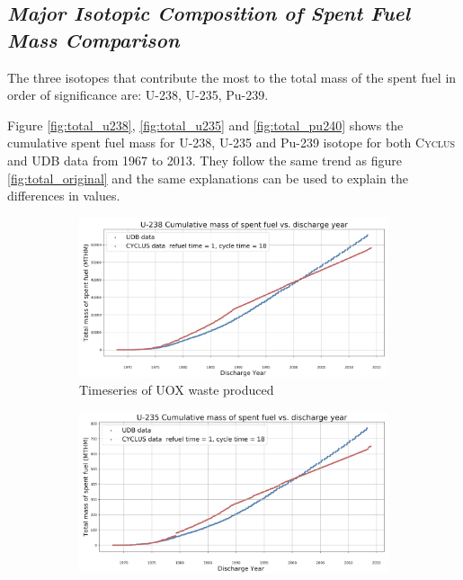 \documentclass{anstrans}
\newcommand{\Cyclus}{\textsc{Cyclus}\xspace}%
\begin{document}
\subsection{\textit{Major Isotopic Composition of  Spent Fuel Mass Comparison}}
The three isotopes that contribute the most to the total mass of the spent fuel in order of significance are: U-238, U-235, Pu-239.  

Figure \ref{fig:total_u238}, \ref{fig:total_u235} and \ref{fig:total_pu240} shows the cumulative spent fuel mass for U-238, U-235 and Pu-239 isotope for both \Cyclus and UDB data from 1967 to 2013.
They follow the same trend as figure \ref{fig:total_original} and the same explanations can be used to explain the differences in values. 

\begin{figure}[ht]
	\centering
	\begin{subfigure}[b]{0.45\textwidth}
		\centering
		\includegraphics[width=\textwidth]{U-238_cumulative_mass_spent_fuel_original}
		\caption[Network2]%
		{{\small Timeseries of UOX waste produced}}    
		\label{fig:uoxwaste}
	\end{subfigure}
	\hfill
	\begin{subfigure}[b]{0.45\textwidth}  
		\centering 
		\includegraphics[width=\textwidth]{U-235_cumulative_mass_spent_fuel_original}

\end{subfigure}
\end{figure}
\end{document}
